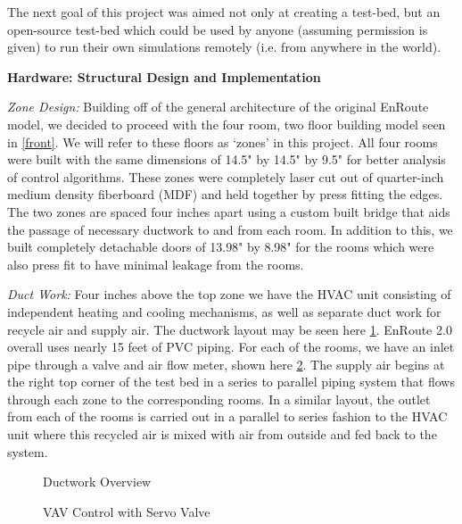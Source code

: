 \documentclass[a4paper,10pt,twocolumn]{article}
\begin{document}
The next goal of this project was aimed not only at creating a test-bed, but an open-source test-bed which could be used by anyone (assuming permission is given) to run their own simulations remotely (i.e. from anywhere in the world).  

\begin{center}
{\bf Hardware:  Structural Design and Implementation}
\end{center}

\emph{Zone Design:}
Building off of the general architecture of the original EnRoute model, we decided to proceed with the four room, two floor building model seen in \ref{front}.  We will refer to these floors as ‘zones’ in this project.  All four rooms were built with the same dimensions of 14.5" by 14.5" by 9.5" for better analysis of control algorithms.  These zones were completely laser cut out of quarter-inch medium density fiberboard (MDF) and held together by press fitting the edges.  The two zones are spaced four inches apart using a custom built bridge that aids the passage of necessary ductwork to and from each room.  In addition to this, we built completely detachable doors of 13.98" by 8.98" for the rooms which were also press fit to have minimal leakage from the rooms.

\emph{Duct Work:}
Four inches above the top zone we have the HVAC unit consisting of independent heating and cooling mechanisms, as well as separate duct work for recycle air and supply air.  The ductwork layout may be seen here \ref{ductwork}.  EnRoute 2.0 overall uses nearly 15 feet of PVC piping.  For each of the rooms, we have an inlet pipe through a valve and air flow meter, shown here \ref{vav}.  The supply air begins at the right top corner of the test bed in a series to parallel piping system that flows through each zone to the corresponding rooms.  In a similar layout, the outlet from each of the rooms is carried out in a parallel to series fashion to the HVAC unit where this recycled air is mixed with air from outside and fed back to the system.

\begin{figure}[t]
\centering
{}
\caption{Ductwork Overview}
\label{ductwork}
\end{figure}

\begin{figure}[t]
\centering
{}
\caption{VAV Control with Servo Valve}
\label{vav}
\end{figure}
\end{document}

